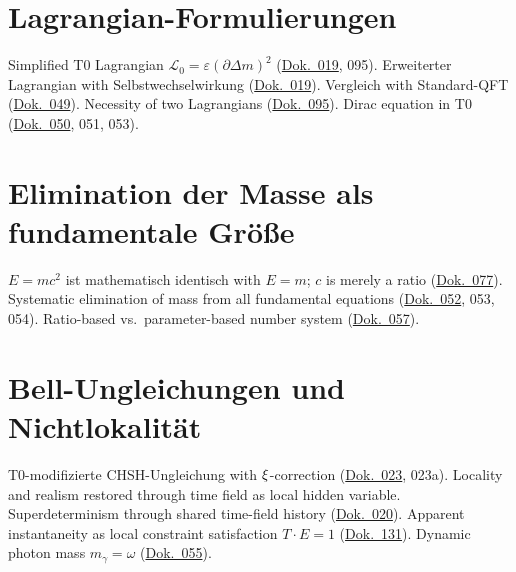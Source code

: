 \section{Lagrangian-Formulierungen}
Simplified T0 Lagrangian $\mathcal{L}_0 = \varepsilon(\partial\Delta m)^2$ (\href{https://github.com/jpascher/T0-Time-Mass-Duality/blob/main/2/pdf/019_T0_lagrndian_De.pdf}{Dok.~019}, 095). Erweiterter Lagrangian with Selbstwechselwirkung (\href{https://github.com/jpascher/T0-Time-Mass-Duality/blob/main/2/pdf/019_T0_lagrndian_De.pdf}{Dok.~019}). Vergleich with Standard-QFT (\href{https://github.com/jpascher/T0-Time-Mass-Duality/blob/main/2/pdf/049_LagrandianVergleich_De.pdf}{Dok.~049}). Necessity of two Lagrangians (\href{https://github.com/jpascher/T0-Time-Mass-Duality/blob/main/2/pdf/095_Notwendigkeit_zwei_lagrange_De.pdf}{Dok.~095}). Dirac equation in T0 (\href{https://github.com/jpascher/T0-Time-Mass-Duality/blob/main/2/pdf/050_diracVereinfacht_De.pdf}{Dok.~050}, 051, 053).

\section{Elimination der Masse als fundamentale Größe}
$E = mc^2$ ist mathematisch identisch with $E = m$; $c$ is merely a ratio (\href{https://github.com/jpascher/T0-Time-Mass-Duality/blob/main/2/pdf/077_E-mc2_De.pdf}{Dok.~077}). Systematic elimination of mass from all fundamental equations (\href{https://github.com/jpascher/T0-Time-Mass-Duality/blob/main/2/pdf/052_EliminationOfMass_De.pdf}{Dok.~052}, 053, 054). Ratio-based vs.\ parameter-based number system (\href{https://github.com/jpascher/T0-Time-Mass-Duality/blob/main/2/pdf/057_RelokativesZahlensystem_De.pdf}{Dok.~057}).

\section{Bell-Ungleichungen und Nichtlokalität}
T0-modifizierte CHSH-Ungleichung with $\xi$-correction (\href{https://github.com/jpascher/T0-Time-Mass-Duality/blob/main/2/pdf/023_Bell_De.pdf}{Dok.~023}, 023a). Locality and realism restored through time field as local hidden variable. Superdeterminism through shared time-field history (\href{https://github.com/jpascher/T0-Time-Mass-Duality/blob/main/2/pdf/020_T0_QM-QFT-RT_De.pdf}{Dok.~020}). Apparent instantaneity as local constraint satisfaction $T \cdot E = 1$ (\href{https://github.com/jpascher/T0-Time-Mass-Duality/blob/main/2/pdf/131_scheinbar_instantan_De.pdf}{Dok.~131}). Dynamic photon mass $m_\gamma = \omega$ (\href{https://github.com/jpascher/T0-Time-Mass-Duality/blob/main/2/pdf/055_DynMassePhotonenNichtlokal_De.pdf}{Dok.~055}).

